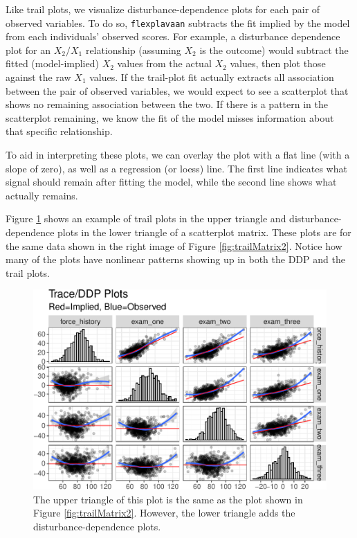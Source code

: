 \documentclass[
  english,
  man]{apa6}
\begin{document}
Like trail plots, we visualize disturbance-dependence plots for each pair of observed variables. To do so, \texttt{flexplavaan} subtracts the fit implied by the model from each individuals' observed scores. For example, a disturbance dependence plot for an \(X_2/X_1\) relationship (assuming \(X_2\) is the outcome) would subtract the fitted (model-implied) \(X_2\) values from the actual \(X_2\) values, then plot those against the raw \(X_1\) values. If the trail-plot fit actually extracts all association between the pair of observed variables, we would expect to see a scatterplot that shows no remaining association between the two. If there is a pattern in the scatterplot remaining, we know the fit of the model misses information about that specific relationship.

To aid in interpreting these plots, we can overlay the plot with a flat line (with a slope of zero), as well as a regression (or loess) line. The first line indicates what signal should remain after fitting the model, while the second line shows what actually remains.

Figure \ref{fig:ddp} shows an example of trail plots in the upper triangle and disturbance-dependence plots in the lower triangle of a scatterplot matrix. These plots are for the same data shown in the right image of Figure \ref{fig:trailMatrix2}. Notice how many of the plots have nonlinear patterns showing up in both the DDP and the trail plots.



\begin{figure}

{\centering \includegraphics[width=0.9\linewidth]{flexplavaan_draft_files/figure-latex/ddp-1} 

}

\caption{The upper triangle of this plot is the same as the plot shown in Figure \ref{fig:trailMatrix2}. However, the lower triangle adds the disturbance-dependence plots.}\label{fig:ddp}
\end{figure}
\end{document}
